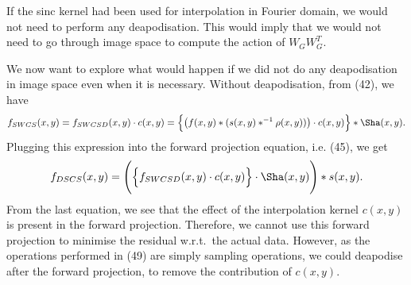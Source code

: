 \documentclass[11pt]{article}
\begin{document}
{\color{gray}
If the sinc kernel had been used for interpolation in Fourier domain, we would not need to perform any deapodisation. This would imply that we would not need to go through image space to compute the action of $W_G W^T_G$.  

We now want to explore what would happen if we did not do any deapodisation in image space even when it is necessary. Without deapodisation, from (42), we have
\begin{equation}
f_{SWCS}(x,y) = f_{SWCSD}(x,y) \cdot c(x,y) = \Big\{\big(f(x,y) \ast (s(x,y) \ast^{-1} \rho(x,y))\big) \cdot c(x,y)\Big\} \ast \Sha(x,y).
\end{equation}
Plugging this expression into the forward projection equation, i.e. (45), we get
\begin{equation}
f_{DSCS}(x,y) = \Bigg(\Big\{f_{SWCSD}(x,y) \cdot c(x,y)\Big\}\cdot \Sha(x,y) \Bigg) \ast s(x,y).
\end{equation}
From the last equation, we see that the effect of the interpolation kernel $c(x,y)$ is present in the forward projection. Therefore, we cannot use this forward projection to minimise the residual w.r.t.~the actual data. However, as the operations performed in (49) are simply sampling operations, we could deapodise after the forward projection, to remove the contribution of $c(x,y)$.
}
\end{document}
